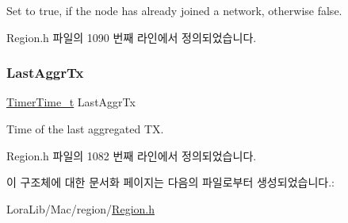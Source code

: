 Set to true, if the node has already joined a network, otherwise false. 

Region.\+h 파일의 1090 번째 라인에서 정의되었습니다.

\mbox{\label{structs_next_chan_params_a381b728f60b185ecf3313e974c18768b}} 
\subsubsection{\texorpdfstring{Last\+Aggr\+Tx}{LastAggrTx}}
{\footnotesize\ttfamily \mbox{\hyperlink{utilities_8h_a4215ca43d3e953099ea758ce428599d0}{Timer\+Time\+\_\+t}} Last\+Aggr\+Tx}

Time of the last aggregated TX. 

Region.\+h 파일의 1082 번째 라인에서 정의되었습니다.



이 구조체에 대한 문서화 페이지는 다음의 파일로부터 생성되었습니다.\+:\begin{DoxyCompactItemize}
\item 
Lora\+Lib/\+Mac/region/\mbox{\hyperlink{_region_8h}{Region.\+h}}\end{DoxyCompactItemize}
